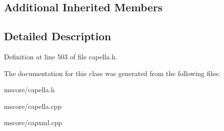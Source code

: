\subsection*{Additional Inherited Members}


\subsection{Detailed Description}


Definition at line 503 of file capella.\+h.



The documentation for this class was generated from the following files\+:\begin{DoxyCompactItemize}
\item 
mscore/capella.\+h\item 
mscore/capella.\+cpp\item 
mscore/capxml.\+cpp\end{DoxyCompactItemize}
